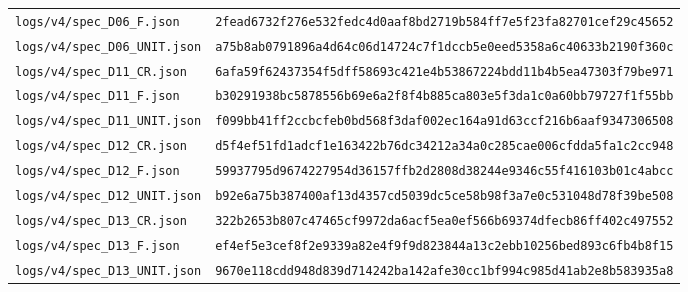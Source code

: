 \documentclass[11pt,a4paper]{article}
\newcommand{\loc}[1]{\nolinkurl{#1}}
\theoremstyle{plain}
\theoremstyle{definition}
\theoremstyle{remark}
\numberwithin{equation}{section}
\begin{document}
\begin{longtable}{@{}L{.50\linewidth}L{.44\linewidth}@{}}
{\footnotesize\loc{logs/v4/spec_D06_F.json}} & \texttt{\scriptsize 2fead6732f276e532fedc4d0aaf8bd27}\newline\texttt{\scriptsize 19b584ff7e5f23fa82701cef29c45652}\\
{\footnotesize\loc{logs/v4/spec_D06_UNIT.json}} & \texttt{\scriptsize a75b8ab0791896a4d64c06d14724c7f1}\newline\texttt{\scriptsize dccb5e0eed5358a6c40633b2190f360c}\\
{\footnotesize\loc{logs/v4/spec_D11_CR.json}} & \texttt{\scriptsize 6afa59f62437354f5dff58693c421e4b}\newline\texttt{\scriptsize 53867224bdd11b4b5ea47303f79be971}\\
{\footnotesize\loc{logs/v4/spec_D11_F.json}} & \texttt{\scriptsize b30291938bc5878556b69e6a2f8f4b88}\newline\texttt{\scriptsize 5ca803e5f3da1c0a60bb79727f1f55bb}\\
{\footnotesize\loc{logs/v4/spec_D11_UNIT.json}} & \texttt{\scriptsize f099bb41ff2ccbcfeb0bd568f3daf002}\newline\texttt{\scriptsize ec164a91d63ccf216b6aaf9347306508}\\
{\footnotesize\loc{logs/v4/spec_D12_CR.json}} & \texttt{\scriptsize d5f4ef51fd1adcf1e163422b76dc3421}\newline\texttt{\scriptsize 2a34a0c285cae006cfdda5fa1c2cc948}\\
{\footnotesize\loc{logs/v4/spec_D12_F.json}} & \texttt{\scriptsize 59937795d9674227954d36157ffb2d28}\newline\texttt{\scriptsize 08d38244e9346c55f416103b01c4abcc}\\
{\footnotesize\loc{logs/v4/spec_D12_UNIT.json}} & \texttt{\scriptsize b92e6a75b387400af13d4357cd5039dc}\newline\texttt{\scriptsize 5ce58b98f3a7e0c531048d78f39be508}\\
{\footnotesize\loc{logs/v4/spec_D13_CR.json}} & \texttt{\scriptsize 322b2653b807c47465cf9972da6acf5e}\newline\texttt{\scriptsize a0ef566b69374dfecb86ff402c497552}\\
{\footnotesize\loc{logs/v4/spec_D13_F.json}} & \texttt{\scriptsize ef4ef5e3cef8f2e9339a82e4f9f9d823}\newline\texttt{\scriptsize 844a13c2ebb10256bed893c6fb4b8f15}\\
{\footnotesize\loc{logs/v4/spec_D13_UNIT.json}} & \texttt{\scriptsize 9670e118cdd948d839d714242ba142af}\newline\texttt{\scriptsize e30cc1bf994c985d41ab2e8b583935a8}\\

\end{longtable}
\end{document}
